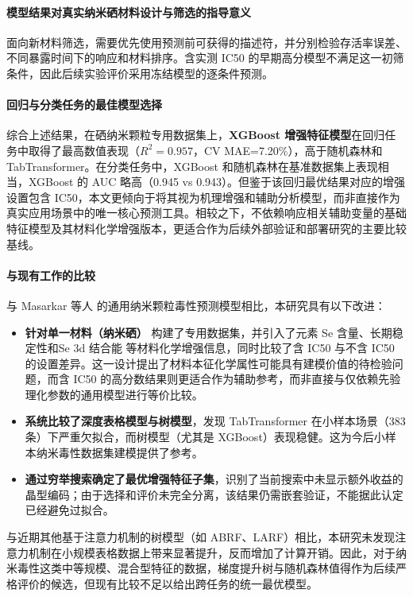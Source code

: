 \paragraph{模型结果对真实纳米硒材料设计与筛选的指导意义}
面向新材料筛选，需要优先使用预测前可获得的描述符，并分别检验存活率误差、不同暴露时间下的响应和材料排序。含实测 IC50 的早期高分模型不满足这一初筛条件，因此后续实验评价采用冻结模型的逐条件预测。

\paragraph{回归与分类任务的最佳模型选择}
综合上述结果，在硒纳米颗粒专用数据集上，\textbf{XGBoost 增强特征模型}在回归任务中取得了最高数值表现（$R^2=0.957$，CV MAE=7.20\%），高于随机森林和 TabTransformer。在分类任务中，XGBoost 和随机森林在基准数据集上表现相当，XGBoost 的 AUC 略高（0.945 vs 0.943）。但鉴于该回归最优结果对应的增强设置包含 IC50，本文更倾向于将其视为机理增强和辅助分析模型，而非直接作为真实应用场景中的唯一核心预测工具。相较之下，不依赖响应相关辅助变量的基础特征模型及其材料化学增强版本，更适合作为后续外部验证和部署研究的主要比较基线。

\paragraph{与现有工作的比较}
与 Masarkar 等人 \cite{masarkar2024} 的通用纳米颗粒毒性预测模型相比，本研究具有以下改进：
\begin{itemize}
  \item \textbf{针对单一材料（纳米硒）} 构建了专用数据集，并引入了元素 Se 含量、长期稳定性和Se 3d 结合能 等材料化学增强信息，同时比较了含 IC50 与不含 IC50 的设置差异。这一设计提出了材料本征化学属性可能具有建模价值的待检验问题，而含 IC50 的高分数结果则更适合作为辅助参考，而非直接与仅依赖先验理化参数的通用模型进行等价比较。
  \item \textbf{系统比较了深度表格模型与树模型}，发现 TabTransformer 在小样本场景（383 条）下严重欠拟合，而树模型（尤其是 XGBoost）表现稳健。这为今后小样本纳米毒性数据集建模提供了参考。
  \item \textbf{通过穷举搜索确定了最优增强特征子集}，识别了当前搜索中未显示额外收益的晶型编码；由于选择和评价未完全分离，该结果仍需嵌套验证，不能据此认定已经避免过拟合。
\end{itemize}
与近期其他基于注意力机制的树模型（如 ABRF、LARF）相比，本研究未发现注意力机制在小规模表格数据上带来显著提升，反而增加了计算开销。因此，对于纳米毒性这类中等规模、混合型特征的数据，梯度提升树与随机森林值得作为后续严格评价的候选，但现有比较不足以给出跨任务的统一最优模型。

